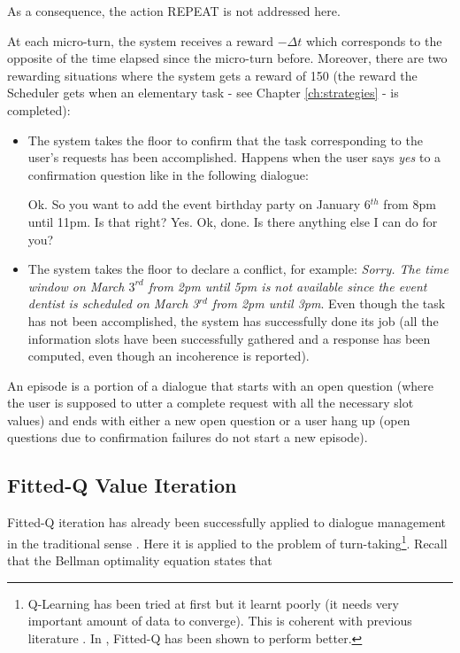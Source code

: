 			As a consequence, the action REPEAT is not addressed here.
        
    	At each micro-turn, the system receives a reward $-\Delta t$ which corresponds to the opposite of the time elapsed since the micro-turn before. Moreover, there are two rewarding situations where the system gets a reward of 150 (the reward the Scheduler gets when an elementary task - see Chapter \ref{ch:strategies} - is completed):
        
        \begin{itemize}
        	\item The system takes the floor to confirm that the task corresponding to the user's requests has been accomplished. Happens when the user says \textit{yes} to a confirmation question like in the following dialogue:

                  \begin{dialogue}
                     Ok. So you want to add the event birthday party on January 6$^{th}$ from 8pm until 11pm. Is that right?
                     Yes.
                     Ok, done. Is there anything else I can do for you?
                  \end{dialogue}

            \item The system takes the floor to declare a conflict, for example: \textit{Sorry. The time window on March $3^{rd}$ from 2pm until 5pm is not available since the event dentist is scheduled on March 3$^{rd}$ from 2pm until 3pm}. Even though the task has not been accomplished, the system has successfully done its job (all the information slots have been successfully gathered and a response has been computed, even though an incoherence is reported).
        \end{itemize}
        
        An episode is a portion of a dialogue that starts with an open question (where the user is supposed to utter a complete request with all the necessary slot values) and ends with either a new open question or a user hang up (open questions due to confirmation failures do not start a new episode).
            
	\subsection{Fitted-Q Value Iteration}
    
    	Fitted-Q iteration \cite{Bellman1959} has already been successfully applied to dialogue management in the traditional sense \cite{Chandramohan2010}. Here it is applied to the problem of turn-taking\footnote{Q-Learning has been tried at first but it learnt poorly (it needs very important amount of data to converge). This is coherent with previous literature \cite{Lemon2006}. In \cite{Daubigney2013}, Fitted-Q has been shown to perform better.}. Recall that the Bellman optimality equation states that
			
